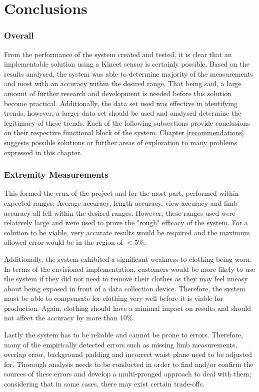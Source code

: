 \chapter{Conclusions}

\subsection{Overall}
From the performance of the system created and tested, it is clear that an implementable solution using a Kinect sensor is certainly possible. Based on the results analysed, the system was able to determine majority of the measurements and most with an accuracy within the desired range. That being said, a large amount of further research and development is needed before this solution become practical. Additionally, the data set used was effective in identifying trends, however, a larger data set should be used and analysed determine the legitimacy of these trends. Each of the following subsections provide conclusions on their respective functional block of the system. Chapter \ref{recommendations} suggests possible solutions or further areas of exploration to many problems expressed in this chapter. 

\subsection{Extremity Measurements}
This formed the crux of the project and for the most part, performed within expected ranges: Average accuracy, length accuracy, view accuracy and limb accuracy all fell within the desired ranges. However, these ranges used were relatively large and were used to prove the "rough" efficacy of the system. For a solution to be viable, very accurate results would be required and the maximum allowed error would be in the region of $<5\%$. 

Additionally, the system exhibited a significant weakness to clothing being worn. In terms of the envisioned implementation, customers would be more likely to use the system if they did not need to remove their clothes as they may feel uneasy about being exposed in front of a data collection device. Therefore, the system must be able to compensate for clothing very well before it is viable for production. Again, clothing should have a minimal impact on results and should not affect the accuracy by more than 10\%.

Lastly the system has to be reliable and cannot be prone to errors. Therefore, many of the empirically detected errors such as missing limb measurements, overlap error, background padding and incorrect waist plane need to be adjusted for. Thorough analysis needs to be conducted in order to find and/or confirm the sources of these errors and develop a multi-pronged approach to deal with them; considering that in some cases, there may exist certain trade-offs.

